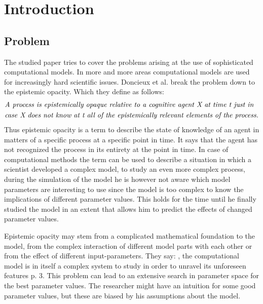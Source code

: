 \documentclass[12pt,twoside]{article}
\theoremstyle{plain}
\theoremstyle{definition}
\theoremstyle{remark}
\begin{document}
\setcounter{tocdepth}{2} 					%
\tableofcontents
{}
\clearpage



\section{Introduction}
\label{sec:introduction}

\subsection{Problem}
The studied paper \cite{doncieux2015multi} tries to cover the problems arising at the use of sophisticated computational models.
In more and more areas computational models are used for increasingly hard scientific issues.
Doncieux et al. break the problem down to the epistemic opacity. Which they define as follows:
\begin{align*}
	&\text{\textit{A process is epistemically opaque relative to a cognitive agent X at time t just in}}\\
	&\text{\textit{case X does not know at t all of the epistemically relevant elements of the process.}}
\end{align*}
Thus epistemic opacity is a term to describe the state of knowledge of an agent in matters of a specific process at a specific point in time.
It says that the agent has not recognized the process in its entirety at the point in time.
In case of computational methods the term can be used to describe a situation in which a scientist developed a complex model, to study an even more complex process, during the simulation of the model he is however not aware which model parameters are interesting to use since the model is too complex to know the implications of different parameter values. This holds for the time until he finally studied the model in an extent that allows him to predict the effects of changed parameter values.\medskip

Epistemic opacity may stem from a complicated mathematical foundation to the model, from the complex interaction of different model parts with each other or from the effect of different input-parameters.
They say: \glqq[...], the computational model is in itself a complex system to study in order to unravel its unforeseen features\grqq{} \cite{doncieux2015multi} p. 3.
This problem can lead to an extensive search in parameter space for the \glqq best\grqq{} parameter values.
The researcher might have an intuition for some good parameter values, but these are biased by his assumptions about the model. 
\end{document}
